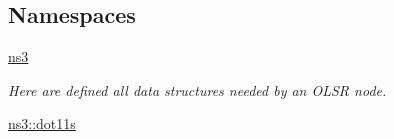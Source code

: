 \subsection*{Namespaces}
\begin{DoxyCompactItemize}
\item 
 \hyperlink{namespacens3}{ns3}
\begin{DoxyCompactList}\small\item\em Here are defined all data structures needed by an O\+L\+SR node. \end{DoxyCompactList}\item 
 \hyperlink{namespacens3_1_1dot11s}{ns3\+::dot11s}
\end{DoxyCompactItemize}
